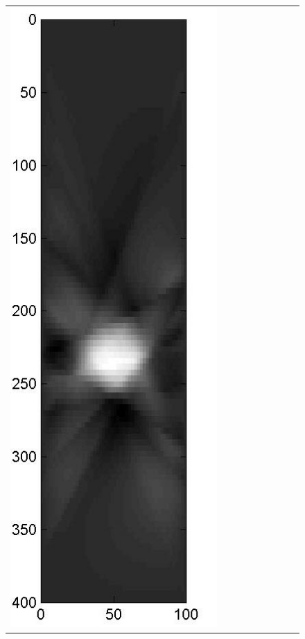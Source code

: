\documentclass[11pt]{article}
\begin{document}
{\begin{figure}[!h]
\begin{center}
\begin{tabular}{|c|c|c|c|c|c|c|c|c|}
			\includegraphics[width=.9\iwidth]{figures/newFigs/noisy/resultsExp-5-mk}
			&

\end{tabular}
\end{center}
\end{figure}}
\end{document}
